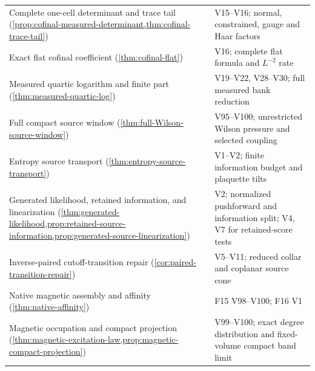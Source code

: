\documentclass[11pt,oneside,openany]{book}
\theoremstyle{definition}
\theoremstyle{remark}
\begin{document}
\begin{longtable}{L{0.32\textwidth}L{0.12\textwidth}L{0.477\textwidth}}
Complete one-cell determinant and trace tail (\cref{prop:cofinal-measured-determinant,thm:cofinal-trace-tail}) & \cite{SM} & V15--V16; normal, constrained, gauge and Haar factors \\
Exact flat cofinal coefficient (\cref{thm:cofinal-flat}) & \cite{SM} & V16; complete flat formula and $L^{-2}$ rate \\
Measured quartic logarithm and finite part (\cref{thm:measured-quartic-log}) & \cite{F14} & V19--V22, V28--V30; full measured bank reduction \\
Full compact source window (\cref{thm:full-Wilson-source-window}) & \cite{F14} & V95--V100; unrestricted Wilson pressure and selected coupling \\
Entropy source transport (\cref{thm:entropy-source-transport}) & \cite{F15} & V1--V2; finite information budget and plaquette tilts \\
Generated likelihood, retained information, and linearization (\cref{thm:generated-likelihood,prop:retained-source-information,prop:generated-source-linearization}) & \cite{F15} & V2; normalized pushforward and information split; V4, V7 for retained-score tests \\

Inverse-paired cutoff-transition repair (\cref{cor:paired-transition-repair}) & \cite{F14} & V5--V11; reduced collar and coplanar source cone \\
Native magnetic assembly and affinity (\cref{thm:native-affinity}) & \cite{F15,F16} & F15 V98--V100; F16 V1 \\
Magnetic occupation and compact projection (\cref{thm:magnetic-excitation-law,prop:magnetic-compact-projection}) & \cite{F15} & V99--V100; exact degree distribution and fixed-volume compact band limit \\


\end{longtable}
\end{document}
